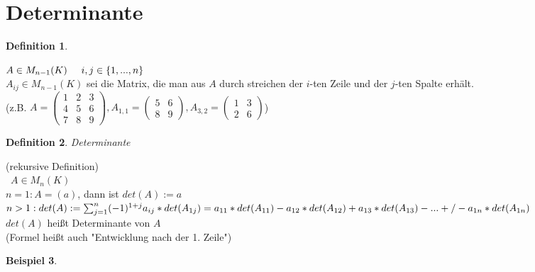 \documentclass[a4paper,11pt]{article}
\newtheorem{definition}{Definition}[section]
\newtheorem{bsp}[definition]{Beispiel}
\begin{document}
\section{Determinante}
\begin{definition}
\end{definition}
$A\in M_{n-1}(K)\hspace{5mm} i,j\in\{1,...,n\}$ \\
$A_{ij}\in M_{n-1}(K)$ sei die Matrix, die man aus $A$ durch streichen der $i$-ten Zeile und der $j$-ten Spalte erhält. \\
(z.B. $A=\begin{pmatrix}1&2&3\\4&5&6\\7&8&9\end{pmatrix}, A_{1,1}=\begin{pmatrix}5&6\\8&9\end{pmatrix}, A_{3,2}=\begin{pmatrix}1&3\\2&6\end{pmatrix}$)
\begin{definition}
Determinante
\end{definition}
(rekursive Definition) \\\
$A\in M_n(K)$ \\
$n=1:A=(a)$, dann ist $det(A):=a$ \\
$n>1:det(A):=\sum^n_{j=1}(-1)^{1+j}a_{ij}*det(A_{1j}) \\
=a_{11}*det(A_{11})-a_{12}*det(A_{12})+a_{13}*det(A_{13})-...+/-a_{1n}*det(A_{1n})$ \\
$det(A)$ heißt Determinante von $A$ \\
(Formel heißt auch "Entwicklung nach der 1. Zeile")
\begin{bsp}
\end{bsp}
\end{document}

